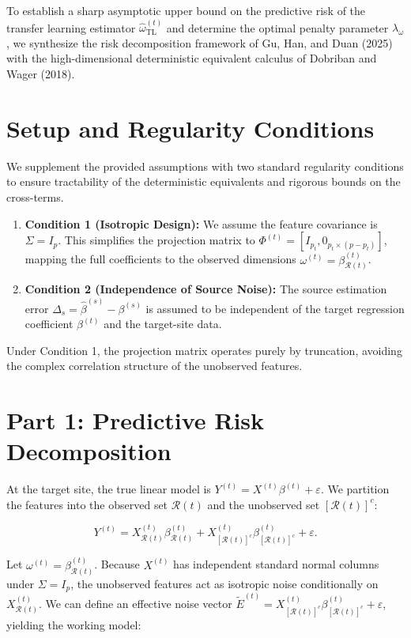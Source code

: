 \documentclass{article}
\begin{document}
To establish a sharp asymptotic upper bound on the predictive risk of the transfer learning estimator $\hat{\omega}_{\mathrm{TL}}^{(t)}$ and determine the optimal penalty parameter $\lambda_{\omega}$, we synthesize the risk decomposition framework of Gu, Han, and Duan (2025) with the high-dimensional deterministic equivalent calculus of Dobriban and Wager (2018).

\section*{Setup and Regularity Conditions}

We supplement the provided assumptions with two standard regularity conditions to ensure tractability of the deterministic equivalents and rigorous bounds on the cross-terms.

\begin{enumerate}
    \item \textbf{Condition 1 (Isotropic Design):} We assume the feature covariance is $\Sigma = I_p$. This simplifies the projection matrix to $\Phi^{(t)} = [I_{p_t}, 0_{p_t \times (p-p_t)}]$, mapping the full coefficients to the observed dimensions $\omega^{(t)} = \beta_{\mathcal{R}(t)}^{(t)}$.
    \item \textbf{Condition 2 (Independence of Source Noise):} The source estimation error $\Delta_s = \hat{\beta}^{(s)} - \beta^{(s)}$ is assumed to be independent of the target regression coefficient $\beta^{(t)}$ and the target-site data.
\end{enumerate}

Under Condition 1, the projection matrix operates purely by truncation, avoiding the complex correlation structure of the unobserved features.

\section*{Part 1: Predictive Risk Decomposition}

At the target site, the true linear model is $Y^{(t)} = X^{(t)}\beta^{(t)} + \varepsilon$. We partition the features into the observed set $\mathcal{R}(t)$ and the unobserved set $[\mathcal{R}(t)]^c$:

\[
Y^{(t)} = X_{\mathcal{R}(t)}^{(t)}\beta_{\mathcal{R}(t)}^{(t)} + X_{[\mathcal{R}(t)]^c}^{(t)}\beta_{[\mathcal{R}(t)]^c}^{(t)} + \varepsilon.
\]

Let $\omega^{(t)} = \beta_{\mathcal{R}(t)}^{(t)}$. Because $X^{(t)}$ has independent standard normal columns under $\Sigma = I_p$, the unobserved features act as isotropic noise conditionally on $X_{\mathcal{R}(t)}^{(t)}$. We can define an effective noise vector $\tilde{E}^{(t)} = X_{[\mathcal{R}(t)]^c}^{(t)}\beta_{[\mathcal{R}(t)]^c}^{(t)} + \varepsilon$, yielding the working model:
\end{document}

